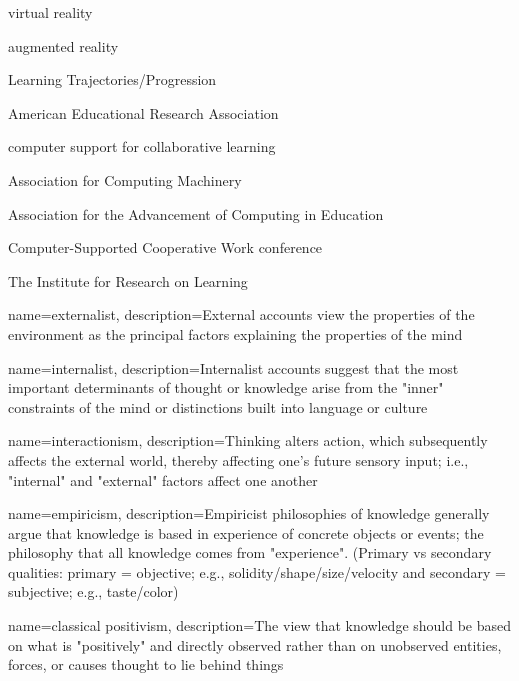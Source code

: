 {\gls{virtual reality}}


{\gls{augmented reality}}



{Learning Trajectories/Progression}

{American Educational Research Association}


{computer support for collaborative learning}

{Association for Computing Machinery} 

{Association for the Advancement of Computing in Education}

{Computer-Supported Cooperative Work conference}

{The Institute for Research on Learning}

 
{
	name=externalist,
	description={External accounts view the properties of the environment as the principal factors explaining the properties of the mind \parencite{bredo_philosophies_2006}}
}


{
	name=internalist,
	description={Internalist accounts suggest that the most important determinants of thought or knowledge arise from the "inner" constraints of the mind or distinctions built into language or culture \parencite{bredo_philosophies_2006}}
}


{
	name=interactionism,
	description={Thinking alters action, which subsequently affects the external world, thereby affecting one's future sensory input; i.e., "internal" and "external" factors affect one another \parencite{bredo_philosophies_2006}}
}


{
	name=empiricism,
	description={Empiricist philosophies of knowledge generally argue that knowledge is based in experience of concrete objects or events; the philosophy that all knowledge comes from "experience". (Primary vs secondary qualities: primary = objective; e.g., solidity/shape/size/velocity and secondary = subjective; e.g., taste/color) \parencite{bredo_philosophies_2006}}
}


{
	name={classical positivism},
	description={The view that knowledge should be based on what is "positively" and directly observed rather than on unobserved entities, forces, or causes thought to lie behind things \parencite{bredo_philosophies_2006}}
}


